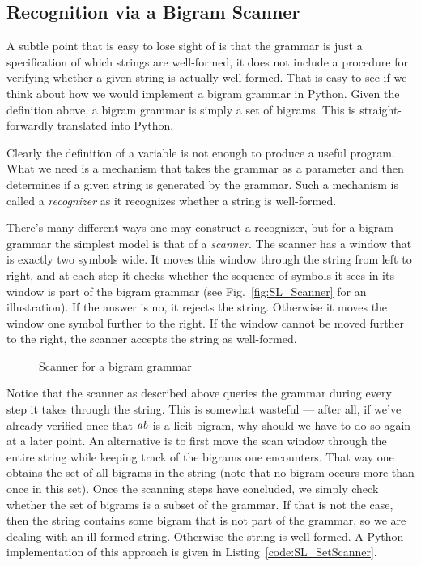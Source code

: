 \subsection{Recognition via a Bigram Scanner}
A subtle point that is easy to lose sight of is that the grammar is just a specification of which strings are well-formed, it does not include a procedure for verifying whether a given string is actually well-formed.
That is easy to see if we think about how we would implement a bigram grammar in Python.
Given the definition above, a bigram grammar is simply a set of bigrams.
This is straight-forwardly translated into Python.
%
\begin{center}
\end{center}
%
Clearly the definition of a variable is not enough to produce a useful program.
What we need is a mechanism that takes the grammar as a parameter and then determines if a given string is generated by the grammar.
Such a mechanism is called a \emph{recognizer} as it recognizes whether a string is well-formed.

There's many different ways one may construct a recognizer, but for a bigram grammar the simplest model is that of a \emph{scanner}.
The scanner has a window that is exactly two symbols wide.
It moves this window through the string from left to right, and at each step it checks whether the sequence of symbols it sees in its window is part of the bigram grammar (see Fig.~\vref{fig:SL_Scanner} for an illustration).
If the answer is no, it rejects the string.
Otherwise it moves the window one symbol further to the right.
If the window cannot be moved further to the right, the scanner accepts the string as well-formed.
%
\begin{figure}[tbph]
\centering

\caption{Scanner for a bigram grammar}
\label{fig:SL_Scanner}
\end{figure}

Notice that the scanner as described above queries the grammar during every step it takes through the string.
This is somewhat wasteful --- after all, if we've already verified once that $\mathit{ab}$ is a licit bigram, why should we have to do so again at a later point.
An alternative is to first move the scan window through the entire string while keeping track of the bigrams one encounters.
That way one obtains the set of all bigrams in the string (note that no bigram occurs more than once in this set).
Once the scanning steps have concluded, we simply check whether the set of bigrams is a subset of the grammar.
If that is not the case, then the string contains some bigram that is not part of the grammar, so we are dealing with an ill-formed string. 
Otherwise the string is well-formed.
A Python implementation of this approach is given in Listing~\vref{code:SL_SetScanner}.

